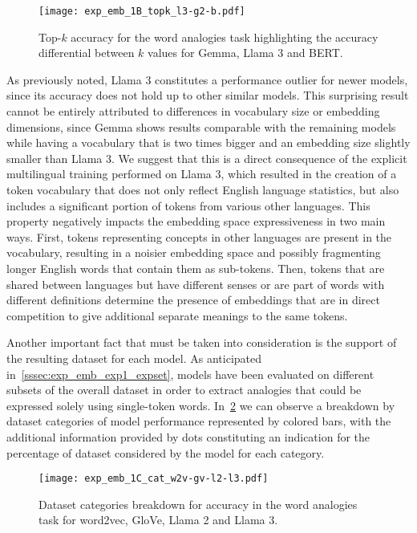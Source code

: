 \begin{figure}[t!]
    \centering
    \texttt{[image: exp\_emb\_1B\_topk\_l3-g2-b.pdf]}
    \caption[Top-$k$ accuracy for the word analogies task highlighting the accuracy differential between $k$ values for various models.]{Top-$k$ accuracy for the word analogies task highlighting the accuracy differential between $k$ values for Gemma, Llama 3 and BERT.}
    \label{fig:exp_emb_1_B}
\end{figure}

As previously noted, Llama 3 constitutes a performance outlier for newer models, since its accuracy does not hold up to other similar models.
This surprising result cannot be entirely attributed to differences in vocabulary size or embedding dimensions, since Gemma shows results comparable with the remaining models while having a vocabulary that is two times bigger and an embedding size slightly smaller than Llama 3.
We suggest that this is a direct consequence of the explicit multilingual training performed on Llama 3, which resulted in the creation of a token vocabulary that does not only reflect English language statistics, but also includes a significant portion of tokens from various other languages.
This property negatively impacts the embedding space expressiveness in two main ways.
First, tokens representing concepts in other languages are present in the vocabulary, resulting in a noisier embedding space and possibly fragmenting longer English words that contain them as sub-tokens.
Then, tokens that are shared between languages but have different senses or are part of words with different definitions determine the presence of embeddings that are in direct competition to give additional separate meanings to the same tokens.

Another important fact that must be taken into consideration is the support of the resulting dataset for each model.
As anticipated in~\cref{sssec:exp_emb_exp1_expset}, models have been evaluated on different subsets of the overall dataset in order to extract analogies that could be expressed solely using single-token words.
In~\cref{fig:exp_emb_1_C} we can observe a breakdown by dataset categories of model performance represented by colored bars, with the additional information provided by dots constituting an indication for the percentage of dataset considered by the model for each category.

\begin{figure}[t!]
    \centering
    \texttt{[image: exp\_emb\_1C\_cat\_w2v-gv-l2-l3.pdf]}
    \caption[Dataset categories breakdown for accuracy in the word analogies task for various models.]{Dataset categories breakdown for accuracy in the word analogies task for word2vec, GloVe, Llama 2 and Llama 3.}
    \label{fig:exp_emb_1_C}
\end{figure}

